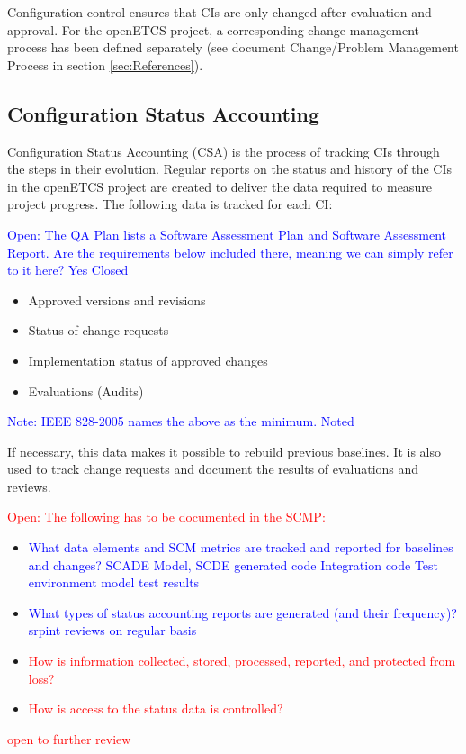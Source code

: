 \documentclass{template/openetcs_report}
\begin{document}
Configuration control ensures that CIs are only changed after evaluation and approval. For the openETCS project, a corresponding change management process has been defined separately (see document Change/Problem Management Process in section \ref{sec:References}).


\subsection{Configuration Status Accounting} %
\label{sec:Configuration Status Accounting}

Configuration Status Accounting (CSA) is the process of tracking CIs through the steps in their evolution. Regular reports on the status and history of the CIs in the openETCS project are created to deliver the data required to measure project progress. The following data is tracked for each CI:

\textcolor{blue}{Open: The QA Plan lists a Software Assessment Plan and Software Assessment Report. Are the requirements below included there, meaning we can simply refer to it here? Yes Closed}

\vspace{-10pt}
\begin{itemize}
\item Approved versions and revisions
\item Status of change requests
\item Implementation status of approved changes
\item Evaluations (Audits)
\end{itemize}

\textcolor{blue}{Note: IEEE 828-2005 names the above as the minimum. Noted}

If necessary, this data makes it possible to rebuild previous baselines. It is also used to track change requests and document the results of evaluations and reviews.

\textcolor{red}{Open: The following has to be documented in the SCMP:}

\vspace{-10pt}
\begin{itemize}
\item \textcolor{blue}{What data elements and SCM metrics are tracked and reported for baselines and
changes?
SCADE Model, SCDE generated code Integration code Test environment model test results}
\item \textcolor{blue}{What types of status accounting reports are generated (and their frequency)? srpint reviews on regular basis}
\item \textcolor{red}{How is information collected, stored, processed, reported, and protected from loss?}
\item \textcolor{red}{How is access to the status data is controlled?}
\end{itemize}
\textcolor{red}{open to further review }
\end{document}
